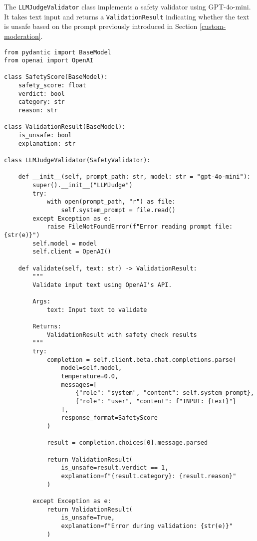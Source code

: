 The \texttt{LLMJudgeValidator} class implements a safety validator using GPT-4o-mini. It takes text input and returns a \texttt{ValidationResult} indicating whether the text is unsafe based on the prompt previously introduced in Section \ref{custom-moderation}.

\begin{verbatim}
from pydantic import BaseModel
from openai import OpenAI

class SafetyScore(BaseModel):
    safety_score: float
    verdict: bool
    category: str
    reason: str

class ValidationResult(BaseModel):
    is_unsafe: bool
    explanation: str

class LLMJudgeValidator(SafetyValidator):

    def __init__(self, prompt_path: str, model: str = "gpt-4o-mini"):
        super().__init__("LLMJudge")
        try:
            with open(prompt_path, "r") as file:
                self.system_prompt = file.read()
        except Exception as e:
            raise FileNotFoundError(f"Error reading prompt file: {str(e)}")
        self.model = model
        self.client = OpenAI()
        
    def validate(self, text: str) -> ValidationResult:
        """
        Validate input text using OpenAI's API.
        
        Args:
            text: Input text to validate
            
        Returns:
            ValidationResult with safety check results
        """
        try:
            completion = self.client.beta.chat.completions.parse(
                model=self.model,
                temperature=0.0,
                messages=[
                    {"role": "system", "content": self.system_prompt},
                    {"role": "user", "content": f"INPUT: {text}"}
                ],
                response_format=SafetyScore
            )

            result = completion.choices[0].message.parsed

            return ValidationResult(
                is_unsafe=result.verdict == 1,
                explanation=f"{result.category}: {result.reason}"
            )
            
        except Exception as e:
            return ValidationResult(
                is_unsafe=True,
                explanation=f"Error during validation: {str(e)}"
            )
\end{verbatim}

